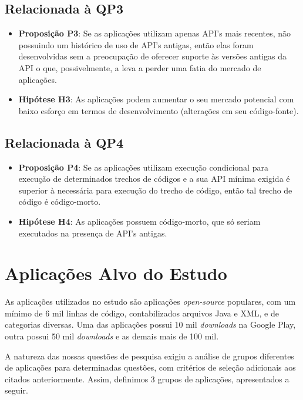 \subsection{Relacionada à QP3}
	\begin{itemize}
		\item \textbf{Proposição P3}: Se as aplicações utilizam apenas API's mais recentes,
		não possuindo um histórico de uso de API's antigas, então elas foram desenvolvidas
		sem a preocupação de oferecer suporte às versões antigas da API o que, possivelmente,
		a leva a perder uma fatia do mercado de aplicações.
		\item \textbf{Hipótese H3}: As aplicações podem aumentar o seu mercado potencial com
		baixo esforço em termos de desenvolvimento (alterações em seu código-fonte).
	\end{itemize}

\subsection{Relacionada à QP4}
	\begin{itemize}
		\item \textbf{Proposição P4}: Se as aplicações utilizam execução condicional para
		execução de determinados trechos de códigos e a sua API mínima exigida é superior
		à necessária para execução do trecho de código, então tal trecho de código é código-morto.   
		\item \textbf{Hipótese H4}: As aplicações possuem código-morto, que só seriam executados
		na presença de API's antigas.
	\end{itemize}

\section{Aplicações Alvo do Estudo} \label{sec:aplicacoes-alvo}

As aplicações utilizados no estudo são aplicações \textit{open-source} populares,
com um mínimo de 6 mil linhas de código, contabilizados arquivos Java e XML, e de
categorias diversas. Uma das aplicações possui 10 mil \textit{downloads} na Google
Play, outra possui 50 mil \textit{downloads} e as demais mais de 100 mil.

A natureza das nossas questões de pesquisa exigiu a análise de grupos diferentes
de aplicações para determinadas questões, com critérios de seleção adicionais aos
citados anteriormente. Assim, definimos 3 grupos de aplicações, apresentados a seguir.

